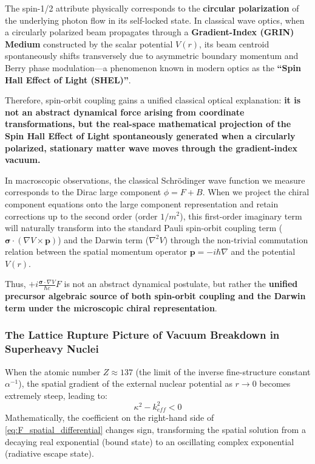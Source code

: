 \documentclass[12pt, a4paper]{article}
\begin{document}
The spin-1/2 attribute physically corresponds to the \textbf{circular polarization} of the underlying photon flow in its self-locked state. In classical wave optics, when a circularly polarized beam propagates through a \textbf{Gradient-Index (GRIN) Medium} constructed by the scalar potential $V(r)$, its beam centroid spontaneously shifts transversely due to asymmetric boundary momentum and Berry phase modulation---a phenomenon known in modern optics as the \textbf{``Spin Hall Effect of Light (SHEL)''}.

Therefore, spin-orbit coupling gains a unified classical optical explanation: \textbf{it is not an abstract dynamical force arising from coordinate transformations, but the real-space mathematical projection of the Spin Hall Effect of Light spontaneously generated when a circularly polarized, stationary matter wave moves through the gradient-index vacuum.}

In macroscopic observations, the classical Schrödinger wave function we measure corresponds to the Dirac large component $\phi = F + B$. When we project the chiral component equations onto the large component representation and retain corrections up to the second order (order $1/m^2$), this first-order imaginary term will naturally transform into the standard Pauli spin-orbit coupling term ($\boldsymbol{\sigma} \cdot (\nabla V \times \mathbf{p})$) and the Darwin term ($\nabla^2 V$) through the non-trivial commutation relation between the spatial momentum operator $\mathbf{p} = -i\hbar\nabla$ and the potential $V(r)$.

Thus, $+i\frac{\boldsymbol{\sigma} \cdot \nabla V}{\hbar c} F$ is not an abstract dynamical postulate, but rather the \textbf{unified precursor algebraic source of both spin-orbit coupling and the Darwin term under the microscopic chiral representation}.

\subsubsection{The Lattice Rupture Picture of Vacuum Breakdown in Superheavy Nuclei}

When the atomic number $Z \approx 137$ (the limit of the inverse fine-structure constant $\alpha^{-1}$), the spatial gradient of the external nuclear potential as $r \to 0$ becomes extremely steep, leading to:
\begin{equation}
    \kappa^2 - k_{eff}^2 < 0
\end{equation}
Mathematically, the coefficient on the right-hand side of \eqref{eq:F_spatial_differential} changes sign, transforming the spatial solution from a decaying real exponential (bound state) to an oscillating complex exponential (radiative escape state).
\end{document}
